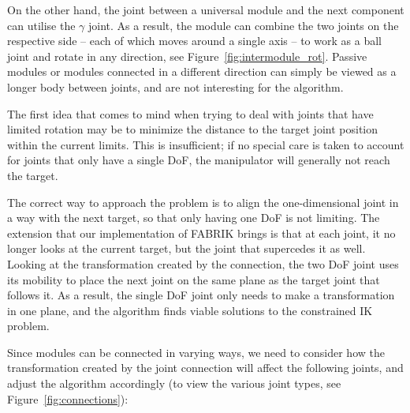 On the other hand, the joint between a universal module and the next component can utilise the $\gamma$ joint. As a result, the module can combine the two joints on the respective side -- each of which moves around a single axis -- to work as a ball joint and rotate in any direction, see Figure~\ref{fig:intermodule_rot}. Passive modules or modules connected in a different direction can simply be viewed as a longer body between joints, and are not interesting for the algorithm.

The first idea that comes to mind when trying to deal with joints that have limited rotation may be to minimize the distance to the target joint position within the current limits. This is insufficient; if no special care is taken to account for joints that only have a single DoF, the manipulator will generally not reach the target.


The correct way to approach the problem is to align the one-dimensional joint in a way with the next target, so that only having one DoF is not limiting. The extension that our implementation of FABRIK brings is that at each joint, it no longer looks at the current target, but the joint that supercedes it as well. Looking at the transformation created by the connection, the two DoF joint uses its mobility to place the next joint on the same plane as the target joint that follows it. As a result, the single DoF joint only needs to make a transformation in one plane, and the algorithm finds viable solutions to the constrained IK problem.

Since modules can be connected in varying ways, we need to consider how the transformation created by the joint connection will affect the following joints, and adjust the algorithm accordingly (to view the various joint types, see Figure~\ref{fig:connections}):

